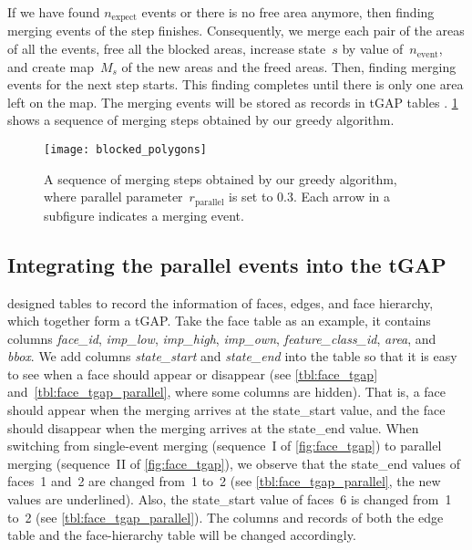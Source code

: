 \documentclass[ijgi,article,submit,moreauthors,pdftex]{Definitions/mdpi}
\begin{document}
If we have found $n_\mathrm{expect}$ events 
or there is no free area anymore,
then finding merging events of the step finishes.
Consequently, we merge each pair of the areas of all the events,
free all the blocked areas,
increase state~$s$ by value of~$n_\mathrm{event}$,
and create map~$M_s$ of the new areas and the freed areas.
Then, finding merging events for the next step starts.
This finding completes until there is only one area left on the map.
The merging events will be stored as records in tGAP tables
\citep[see][]{Meijers2011Thesis}.
\fig\ref{fig:sequence_greedy} shows a sequence of merging steps
obtained by our greedy algorithm.

\begin{figure}[tb]
\centering
\texttt{[image: blocked\_polygons]}
\caption{A sequence of merging steps obtained by our greedy algorithm,
	where parallel parameter~$r_\mathrm{parallel}$ is set to $0.3$.
	Each arrow in a subfigure indicates a merging event.
}
\label{fig:sequence_greedy}
\end{figure}




\subsection{Integrating the parallel events into the tGAP}

\citet[]{Meijers2011Thesis} designed tables 
to record the information of
faces, edges, and face hierarchy, 
which together form a tGAP.
Take the face table as an example,
it contains columns \emph{face\_id}, 
\emph{imp\_low}, \emph{imp\_high}, \emph{imp\_own},
\emph{feature\_class\_id}, \emph{area}, and \emph{bbox}.
We add columns \emph{state\_start} and \emph{state\_end} into the table 
so that it is easy to see when a face should appear or disappear 
(see \tbls\ref{tbl:face_tgap} and~\ref{tbl:face_tgap_parallel},
where some columns are hidden).
That is, a face should appear
when the merging arrives at the state\_start value,
and the face should disappear
when the merging arrives at the state\_end value.
When switching from single-event merging 
(sequence~I of \fig\ref{fig:face_tgap})
to parallel merging (sequence~II of \fig\ref{fig:face_tgap}),
we observe that the state\_end values of faces~1 and~2 are changed from~1 to~2
(see \tbl\ref{tbl:face_tgap_parallel}, the new values are underlined).
Also, the state\_start value of faces~6 is changed from~1 to~2
(see \tbl\ref{tbl:face_tgap_parallel}).
The columns and records of both the edge table and the face-hierarchy table 
will be changed accordingly.
\end{document}
